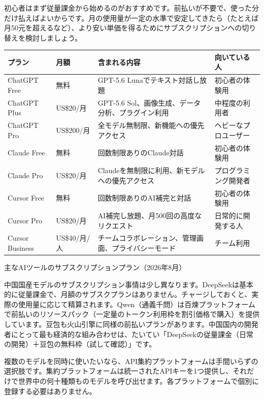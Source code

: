 初心者はまず従量課金から始めるのがおすすめです。前払いが不要で、使った分だけ払えばよいからです。月の使用量が一定の水準で安定してきたら（たとえば月50元を超えるなど）、より安い単価を得るためにサブスクリプションへの切り替えを検討しましょう。


\begin{center}
\begin{tabularx}{\linewidth}{|X|X|X|X|}
\hline
\textbf{プラン} & \textbf{月額} & \textbf{含まれる内容} & \textbf{向いている人} \tabularnewline
\hline
ChatGPT Free & 無料 & GPT-5.6 Lunaでテキスト対話し放題 & 初心者の体験用 \tabularnewline
ChatGPT Plus & US\$20/月 & GPT-5.6 Sol、画像生成、データ分析、プラグイン利用 & 中程度の利用者 \tabularnewline
ChatGPT Pro & US\$200/月 & 全モデル無制限、新機能への優先アクセス & ヘビーなプロユーザー \tabularnewline
Claude Free & 無料 & 回数制限ありのClaude対話 & 初心者の体験用 \tabularnewline
Claude Pro & US\$20/月 & Claudeを無制限に利用、新モデルへの優先アクセス & プログラミング開発者 \tabularnewline
Cursor Free & 無料 & 回数制限ありのAI補完と対話 & 初心者の体験用 \tabularnewline
Cursor Pro & US\$20/月 & AI補完し放題、月500回の高度なリクエスト & 日常的に開発する人 \tabularnewline
Cursor Business & US\$40/月/人 & チームコラボレーション、管理画面、プライバシーモード & チーム利用 \tabularnewline
\hline
\end{tabularx}
\end{center}

\begin{center}\small\color{gray}主なAIツールのサブスクリプションプラン（2026年8月）\end{center}

中国国産モデルのサブスクリプション事情は少し異なります。DeepSeekは基本的に従量課金で、月額のサブスクプランはありません。チャージしておくと、実際の使用量に応じて精算されます。Qwen（通義千問）は百煉プラットフォームで前払いのリソースパック（一定量のトークン利用枠を割引価格で購入）を提供しています。豆包も火山引擎に同様の前払いプランがあります。中国国内の開発者にとって最も経済的な組み合わせは、たいてい「DeepSeekの従量課金（日常の開発）＋豆包の無料枠（試して確認）」です。


複数のモデルを同時に使いたいなら、API集約プラットフォームは手間いらずの選択肢です。集約プラットフォームは統一されたAPIキーを1つ提供し、それだけで世界中の何十種類ものモデルを呼び出せます。各プラットフォームで個別に登録する必要はありません。

